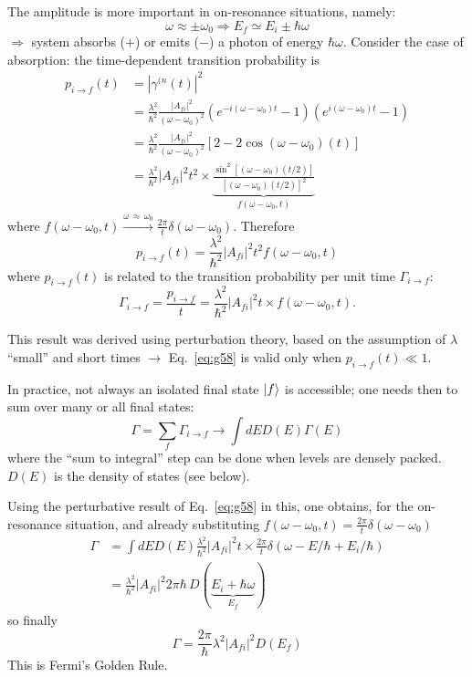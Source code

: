 \documentclass[12pt]{article}
\newcommand{\be}{\begin{equation}}
\newcommand{\ee}{\end{equation}}
\begin{document}
The amplitude is more important in on-resonance
situations, namely:
\be
\omega \approx \pm \omega_{0} \Rightarrow E_{f} \simeq E_{i} \pm \hbar \omega
\ee
$\Rightarrow$ system absorbs ($+$) or emits ($-$) a photon
of energy $\hbar \omega$.
Consider the case of absorption:
the time-dependent transition probability is
\setcounter{equation}{56}
\be
\begin{aligned}
p_{i \rightarrow f}(t)
&=\left|\gamma^{(n}(t)\right|^{2}\\
&=\frac{\lambda^{2}}{\hbar^{2}} \frac{\left|A_{f i}\right|^{2}}{\left(\omega-\omega_{0}\right)^{2}}
\left(e^{-i\left(\omega-\omega_{0}\right) t}-1\right)\left(e^{i\left(\omega-\omega_{0}\right) t}-1\right)\\
&=\frac{\lambda^{2}}{\hbar^{2}} \frac{\left|A_{f i}\right|^{2}}{\left(\omega-\omega_{0}\right)^{2}}
\left[2-2\cos(\omega-\omega_0)(t)\right]\\
&=\frac{\lambda^{2}}{\hbar^{2}} \left|A_{f i}\right|^{2} t^2 \times
\underbrace{\frac{\sin^2\left[(\omega-\omega_0)(t/2)\right]}{\left[(\omega-\omega_{0})(t/2)\right]^{2}}}%
_{f(\omega-\omega_0,t)}
\end{aligned}
\ee
where $f(\omega-\omega_0,t) \xrightarrow{\omega\,\approx\,\omega_0} \frac{2\pi}{t} \delta(\omega-\omega_0)$.
Therefore
\be
p_{i \rightarrow f}(t) = \frac{\lambda^{2}}{\hbar^{2}}\left|A_{f i}\right|^{2} t^2 f(\omega-\omega_0,t)
\label{eq:g58}
\ee
where $p_{i \rightarrow f}(t)$ is related to the transition probability per unit time $\Gamma_{i\to f}$:
\[
\Gamma_{i\to f} = \frac{p_{i \rightarrow f}}{t} = \frac{\lambda^{2}}{\hbar^{2}}\left|A_{f i}\right|^{2} t \times f(\omega-\omega_0,t).
\]


This result was derived using perturbation theory,
based on the assumption of $\lambda$ ``small'' and
short times $\to$ 
Eq.~\eqref{eq:g58} is valid only when $p_{i \rightarrow f}(t) \ll 1$.

In practice, not always an isolated final state
$\ket{f}$ is accessible; one needs then to sum over
many or all final states:
\be
\Gamma=\sum_{f} \Gamma_{i \rightarrow f} \rightarrow \int d E D(E) \Gamma(E)
\ee
where the ``sum to integral'' step can be done when levels are densely packed.
$D(E)$ is the density of states (see below).

Using the perturbative result of Eq.~\eqref{eq:g58} in this,
one obtains, for the on-resonance situation,
and already substituting $f(\omega-\omega_0,t) = \frac{2\pi}{t} \delta(\omega-\omega_0)$
\[
\begin{aligned}
\Gamma 
&=\int d E D(E) \frac{\lambda^{2}}{\hbar^{2}} \left|A_{f i}\right|^{2} t \times \frac{2\pi}{t}
\delta\left(\omega-E / \hbar+E_{i} / \hbar\right)\\
&= \frac{\lambda^{2}}{\hbar^{2}} \left|A_{f i}\right|^{2} 2\pi \hbar \, D(\underbrace{E_i + \hbar \omega}_{E_f})
\end{aligned}
\]
so finally
\be
\Gamma  = \frac{2\pi}{\hbar} \lambda^2 \left|A_{f i}\right|^{2} D(E_f)
\ee
This is Fermi's Golden Rule. 
\end{document}
